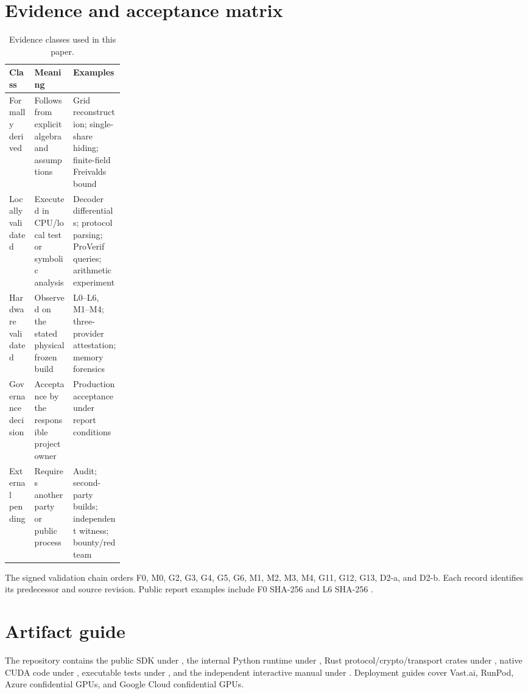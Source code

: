 \section{Evidence and acceptance matrix}\label{app:evidence}

\begin{table}[htbp]
\centering\small
\caption{Evidence classes used in this paper.}
\begin{tabularx}{\linewidth}{p{0.22\linewidth}XX}
\toprule
\textbf{Class} & \textbf{Meaning} & \textbf{Examples} \\
\midrule
Formally derived & Follows from explicit algebra and assumptions & Grid reconstruction; single-share hiding; finite-field Freivalds bound \\
Locally validated & Executed in CPU/local test or symbolic analysis & Decoder differentials; protocol parsing; ProVerif queries; arithmetic experiment \\
Hardware validated & Observed on the stated physical frozen build & L0--L6, M1--M4; three-provider attestation; memory forensics \\
Governance decision & Acceptance by the responsible project owner & Production acceptance under report conditions \\
External pending & Requires another party or public process & Audit; second-party builds; independent witness; bounty/red team \\
\bottomrule
\end{tabularx}
\end{table}

The signed validation chain orders F0, M0, G2, G3, G4, G5, G6, M1, M2, M3, M4, G11, G12, G13, D2-a, and D2-b. Each record identifies its predecessor and source revision. Public report examples include F0 SHA-256  and L6 SHA-256 .

\section{Artifact guide}\label{app:artifact}

The repository contains the public SDK under , the internal Python runtime under , Rust protocol/crypto/transport crates under , native CUDA code under , executable tests under , and the independent interactive manual under . Deployment guides cover Vast.ai, RunPod, Azure confidential GPUs, and Google Cloud confidential GPUs.

